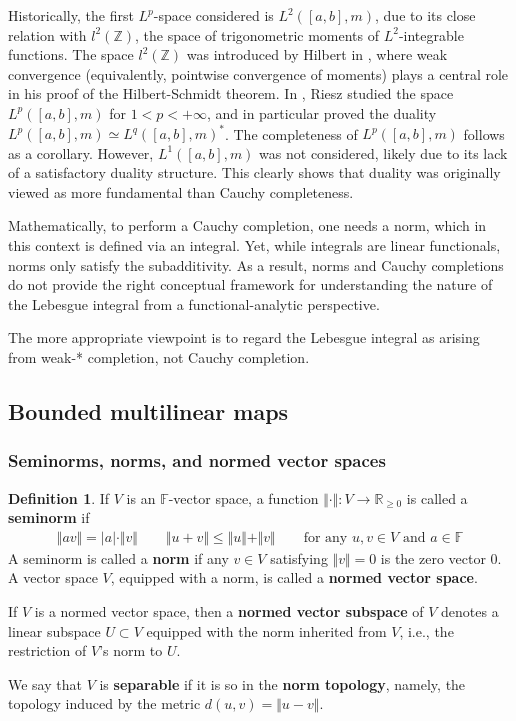 \documentclass[12pt,b5paper,notitlepage]{article}
\theoremstyle{definition}
\newtheorem{df}{Definition}[subsection]
\theoremstyle{plain}
\newcommand{\Zbb}{\mathbb Z}
\newcommand{\Rbb}{\mathbb R}
\newcommand{\Fbb}{\mathbb F}
\newcommand{\hqed}{\hfill\qedsymbol}
\numberwithin{equation}{section}
\begin{document}
Historically, the first $L^p$-space considered is $L^2([a,b],m)$, due to its close relation with $l^2(\Zbb)$, the space of trigonometric moments of $L^2$-integrable functions. The space $l^2(\Zbb)$ was introduced by Hilbert in \cite{Hil06}, where weak convergence (equivalently, pointwise convergence of moments) plays a central role in his proof of the Hilbert-Schmidt theorem. In \cite{Rie10}, Riesz studied the space $L^p([a,b],m)$ for $1<p<+\infty$, and in particular proved the duality $L^p([a,b],m)\simeq L^q([a,b],m)^*$. The completeness of $L^p([a,b],m)$ follows as a corollary. However, $L^1([a,b],m)$ was not considered, likely due to its lack of a satisfactory duality structure. This clearly shows that duality was originally viewed as more fundamental than Cauchy completeness.


Mathematically, to perform a Cauchy completion, one needs a norm, which in this context is defined via an integral. Yet, while integrals are linear functionals, norms only satisfy the subadditivity. As a result, norms and Cauchy completions do not provide the right conceptual framework for understanding the nature of the Lebesgue integral from a functional-analytic perspective.


The more appropriate viewpoint is to regard the Lebesgue integral as arising from weak-* completion, not Cauchy completion.

\normalsize





\subsection{Bounded multilinear maps}


\subsubsection{Seminorms, norms, and normed vector spaces}

\begin{df}\label{lb45}
If $V$ is an $\Fbb$-vector space, a function $\Vert\cdot\Vert:V\rightarrow\Rbb_{\geq0}$ is called a \textbf{seminorm}  if
\begin{align}\label{eq28}
\Vert av\Vert=|a|\cdot\Vert v\Vert\qquad \Vert u+v\Vert\leq\Vert u\Vert+\Vert v\Vert\qquad\text{for any $u,v\in V$ and $a\in\Fbb$}
\end{align}
A seminorm is called a \textbf{norm} if any $v\in V$ satisfying $\Vert v\Vert=0$ is the zero vector $0$. A vector space $V$, equipped with a norm, is called a \textbf{normed vector space}.

If $V$ is a normed vector space, then a \textbf{normed vector subspace}  of $V$ denotes a linear subspace $U\subset V$ equipped with the norm inherited from $V$, i.e., the restriction of $V$'s norm to $U$.  

We say that $V$ is \textbf{separable}  if it is so in the \textbf{norm topology},  namely, the topology induced by the metric $d(u,v)=\Vert u-v\Vert$. \hqed
\end{df}
\end{document}
